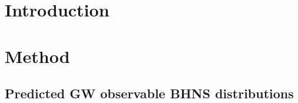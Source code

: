 \documentclass[twocolumn]{aastex63}
\newcommand\bhnsSingle{BHNS\xspace}
\begin{document}



\section{Introduction}
\label{sec:introduction}
%


\section{Method}
\label{sec:method}

\subsection{Predicted GW observable \bhnsSingle distributions }
\label{subsec:distributions-FIducial-GW-observable}

%
%
%
%
\end{document}
